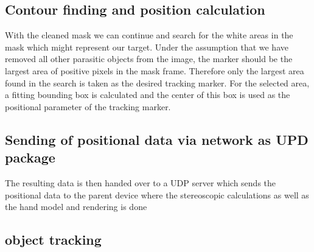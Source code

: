 \subsection{Contour finding and position calculation}
With the cleaned mask we can continue and search for the white areas in the mask which might represent our target. Under the assumption that we have removed all other parasitic objects from the image, the marker should be the largest area of positive pixels in the mask frame. Therefore only the largest area found in the search is taken as the desired tracking marker. For the selected area, a fitting bounding box is calculated and the center of this box is used as the positional parameter of the tracking marker.
\subsection{Sending of positional data via network as UPD package}
The resulting data is then handed over to a UDP server which sends the positional data to the parent device where the stereoscopic calculations as well as the hand model and rendering is done
\subsection{object tracking}
 



 




